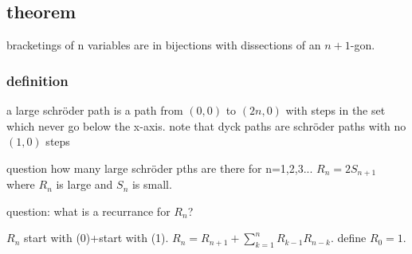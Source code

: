 \documentclass{article}
\begin{document}
\subsection*{theorem}
bracketings of n variables are in bijections with dissections of an $n+1$-gon.
\subsubsection*{definition}
a large schr\"{o}der path is a path  from $(0,0)$ to $(2n,0)$ with steps in the set which never go below the x-axis. note that dyck paths are schr\"{o}der paths with no $(1,0)$ steps

question how many large schr\"{o}der pths are there for n=1,2,3...
$R_n=2S_{n+1}$ where $R_n$ is large and $S_n$ is small.

question: what is a recurrance for $R_n$?

$R_n$ start with (0)+start with (1). $R_n=R_{n+1}+\sum\limits_{k=1}^n{R_{k-1}R_{n-k}}$. define $R_0=1$.
\end{document}
